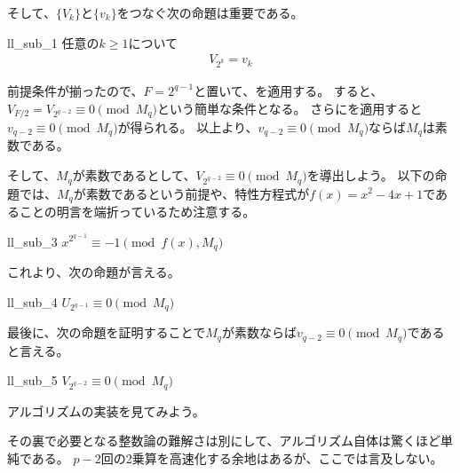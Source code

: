 そして、$\{V_k\}$と$\{v_k\}$をつなぐ次の命題は重要である。

\begin{Prop}{}{ll_sub_1}
任意の$k\ge1$について
\begin{align*}
V_{2^k} = v_k
\end{align*}
\end{Prop}

前提条件が揃ったので、$F=2^{q-1}$と置いて、を適用する。
すると、$V_{F/2} = V_{2^{q-2}} \equiv 0 \pmod{M_q}$という簡単な条件となる。
さらにを適用すると$v_{q-2} \equiv 0 \pmod{M_q}$が得られる。
以上より、$v_{q-2} \equiv 0 \pmod{M_q}$ならば$M_q$は素数である。

そして、$M_q$が素数であるとして、$V_{2^{q-2}}\equiv0\pmod{M_q}$を導出しよう。
以下の命題では、$M_q$が素数であるという前提や、特性方程式が$f(x)=x^2-4x+1$であることの明言を端折っているため注意する。

\begin{Prop}{}{ll_sub_3}
$x^{2^{q-1}}\equiv-1\pmod{f(x),M_q}$
\end{Prop}

これより、次の命題が言える。

\begin{Prop}{}{ll_sub_4}
$U_{2^{q-1}}\equiv0\pmod{M_q}$
\end{Prop}

最後に、次の命題を証明することで$M_q$が素数ならば$v_{q-2} \equiv 0 \pmod{M_q}$であると言える。

\begin{Prop}{}{ll_sub_5}
$V_{2^{q-2}}\equiv0\pmod{M_q}$
\end{Prop}

アルゴリズムの実装を見てみよう。


その裏で必要となる整数論の難解さは別にして、アルゴリズム自体は驚くほど単純である。
$p-2$回の2乗算を高速化する余地はあるが、ここでは言及しない。
